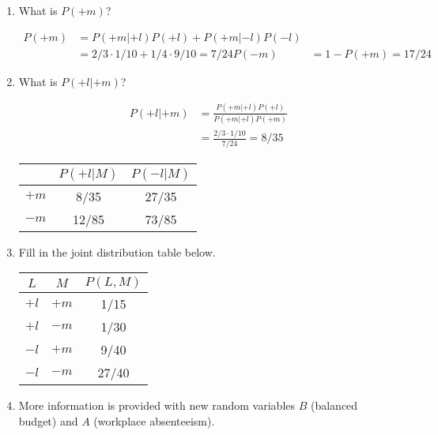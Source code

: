 \documentclass[12pt]{article}
\begin{document}
\begin{enumerate}

\item What is $P(+m)$?

\begin{align*}
P(+m) &= P(+m|+l)P(+l) + P(+m|-l)P(-l)\\
      &= 2/3 \cdot 1/10 + 1/4 \cdot 9/10 = 7/24
P(-m) &= 1 - P(+m) = 17/24
\end{align*}
\item What is $P(+l | +m)$?

\begin{align*}
P(+l|+m) &= \frac{P(+m|+l)P(+l)}{P(+m|+l)P(+m)}\\
         &= \frac{2/3 \cdot 1/10}{7/24} = 8/35
\end{align*}

\begin{center}
\begin{tabular}{|c|c|c|} \hline
     & $P(+l | M)$ & $P(-l | M)$ \\ \hline
$+m$ & 8/35       & 27/35   \\ \hline
$-m$ & 12/85        & 73/85 \\ \hline
\end{tabular}
\end{center}

\item Fill in the joint distribution table below.

\begin{center}
\begin{tabular}{|c|c||c|} \hline
$L$  & $M$   & $P(L, M)$ \\ \hline \hline
$+l$ & $+m$  & 1/15   \\ \hline
$+l$ & $-m$  & 1/30 \\ \hline
$-l$ & $+m$  & 9/40  \\ \hline
$-l$ & $-m$  & 27/40 \\ \hline
\end{tabular}
\end{center}

\item More information is provided with new random variables $B$
  (balanced budget) and $A$ (workplace absenteeism).


\end{enumerate}
\end{document}
